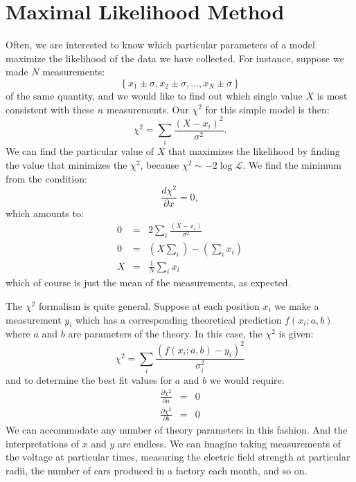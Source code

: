 \documentclass[12pt,oneside]{book}
\begin{document}
\section{Maximal Likelihood Method}

Often, we are interested to know which particular parameters of a model maximize the likelihood
of the data we have collected.  For instance, suppose we made $N$ measurements:
\begin{displaymath}
\left\{ x_1 \pm \sigma, x_2 \pm \sigma, ..., x_N \pm \sigma \right\}
\end{displaymath}
of the same quantity, and we would like to find out which single value $X$ is most consistent with these $n$ measurements.  Our $\chi^2$ for this simple model is then:
\begin{displaymath}
\chi^2 = \sum_i \frac{(X - x_i)^2}{\sigma^2}.
\end{displaymath}
We can find the particular value of $X$ that maximizes the likelihood by finding the value that minimizes the $\chi^2$, because $\chi^2 \sim - 2 \log \mathcal{L}$.  We find the minimum from the condition:
\begin{displaymath}
\frac{d\chi^2}{\partial x} = 0,
\end{displaymath}
which amounts to:
\begin{eqnarray}
0 &=& 2 \sum_i \frac{(X - x_i)}{\sigma^2} \nonumber \\
0 &=& \left( X \sum_i \right)- \left( \sum_i x_i \right) \nonumber \\
X &=& \frac{1}{N} \sum_i x_i \label{eqn:mean}
\end{eqnarray}
which of course is just the mean of the measurements, as expected.

The $\chi^2$ formalism is quite general.  Suppose at each position $x_i$ we make a measurement $y_i$ which has a corresponding theoretical prediction $f(x_i; a, b)$ where $a$ and $b$ are parameters of the theory.  In this case, the $\chi^2$ is given:
\begin{displaymath}
\chi^2 = \sum_i \frac{(f(x_i;a,b) - y_i)^2}{\sigma_i^2}
\end{displaymath}
and to determine the best fit values for $a$ and $b$ we would require:
\begin{eqnarray*}
\frac{\partial \chi^2}{\partial a} &=& 0 \\
\frac{\partial \chi^2}{\partial b} &=& 0 
\end{eqnarray*}
We can accommodate any number of theory parameters in this fashion.  And the interpretations of $x$ and $y$ are endless.  We can imagine taking measurements of the voltage at particular times, measuring the electric field strength at particular radii, the number of cars produced in a factory each month, and so on.
\end{document}
